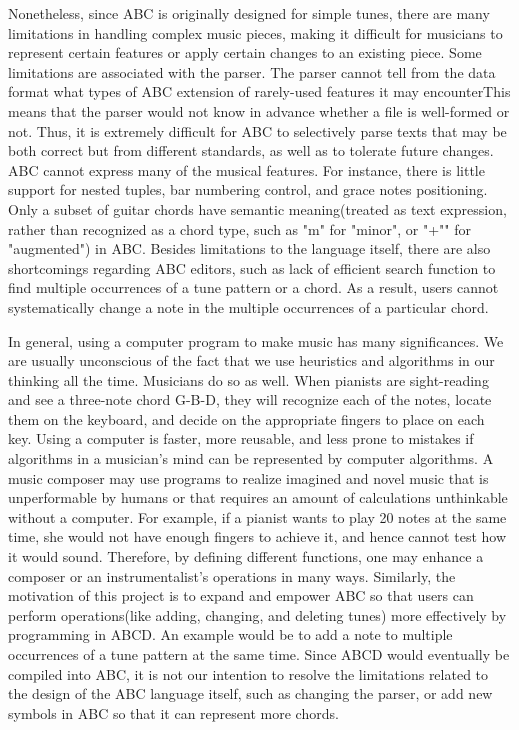 Nonetheless, since ABC is originally designed for simple tunes, there are many limitations in handling complex music pieces, making it difficult for musicians to represent certain features or apply certain changes to an existing piece. Some limitations are associated with the parser. The parser cannot tell from the data format what types of ABC extension of rarely-used features it may encounterThis means that the parser would not know in advance whether a file is well-formed or not. Thus, it is extremely difficult for ABC to selectively parse texts that may be both correct but from different standards, as well as to tolerate future changes\cite{Cuthbert14}. ABC cannot express many of the musical features. For instance, there is little support for nested tuples, bar numbering control, and grace notes positioning\cite{Cuthbert14}. Only a subset of guitar chords have semantic meaning(treated as text expression, rather than recognized as a chord type, such as "m" for "minor", or "+"" for "augmented") in ABC\cite{Chambers02}. Besides limitations to the language itself, there are also shortcomings regarding ABC editors, such as lack of efficient search function to find multiple occurrences of a tune pattern or a chord. As a result, users cannot systematically change a note in the multiple occurrences of a particular chord. 

In general, using a computer program to make music has many significances. We are usually unconscious of the fact that we use heuristics and algorithms in our thinking all the time. Musicians do so as well. When pianists are sight-reading and see a three-note chord G-B-D, they will recognize each of the notes, locate them on the keyboard, and decide on the appropriate fingers to place on each key\cite{Dobrian88}.  Using a computer is faster, more reusable, and less prone to mistakes if  algorithms in a musician's mind can be represented by computer algorithms. A music composer may use programs to realize imagined and novel music that is unperformable by humans or that requires an amount of calculations unthinkable without a computer. For example, if a pianist wants to play 20 notes at the same time, she would not have enough fingers to achieve it, and hence cannot test how it would sound. Therefore, by defining different functions, one may enhance a composer or an instrumentalist's operations in many ways\cite{Dobrian88}. Similarly, the motivation of this project is to expand and empower ABC so that users can perform operations(like adding, changing, and deleting tunes) more effectively by programming in ABCD. An example would be to add a note to multiple occurrences of a tune pattern at the same time.  Since ABCD would eventually be compiled into ABC, it is not our intention to resolve the limitations related to the design of the ABC language itself, such as changing the parser, or add new symbols in ABC so that it can represent more chords.



